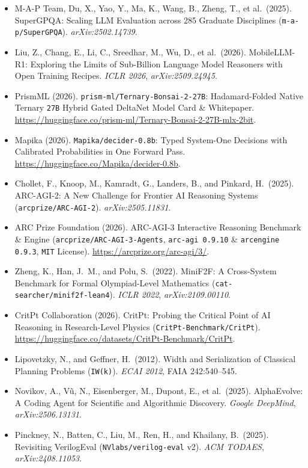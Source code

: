 \documentclass[10pt]{article}
\begin{document}
{\begin{itemize}
  \item M-A-P Team, Du, X., Yao, Y., Ma, K., Wang, B., Zheng, T., et al.\ (2025). SuperGPQA: Scaling LLM Evaluation across 285 Graduate Disciplines (\texttt{m-a-p/SuperGPQA}). \emph{arXiv:2502.14739}.
  \item Liu, Z., Chang, E., Li, C., Sreedhar, M., Wu, D., et al.\ (2026). MobileLLM-R1: Exploring the Limits of Sub-Billion Language Model Reasoners with Open Training Recipes. \emph{ICLR 2026}, \emph{arXiv:2509.24945}.
  \item PrismML (2026). \texttt{prism-ml/Ternary-Bonsai-2-27B}: Hadamard-Folded Native Ternary \texttt{27B} Hybrid Gated DeltaNet Model Card \& Whitepaper. \url{https://huggingface.co/prism-ml/Ternary-Bonsai-2-27B-mlx-2bit}.
  \item Mapika (2026). \texttt{Mapika/decider-0.8b}: Typed System-One Decisions with Calibrated Probabilities in One Forward Pass. \url{https://huggingface.co/Mapika/decider-0.8b}.
  \item Chollet, F., Knoop, M., Kamradt, G., Landers, B., and Pinkard, H.\ (2025). ARC-AGI-2: A New Challenge for Frontier AI Reasoning Systems (\texttt{arcprize/ARC-AGI-2}). \emph{arXiv:2505.11831}.
  \item ARC Prize Foundation (2026). ARC-AGI-3 Interactive Reasoning Benchmark \& Engine (\texttt{arcprize/ARC-AGI-3-Agents}, \texttt{arc-agi 0.9.10} \& \texttt{arcengine 0.9.3}, \texttt{MIT} License). \url{https://arcprize.org/arc-agi/3/}.
  \item Zheng, K., Han, J.\ M., and Polu, S.\ (2022). MiniF2F: A Cross-System Benchmark for Formal Olympiad-Level Mathematics (\texttt{cat-searcher/minif2f-lean4}). \emph{ICLR 2022}, \emph{arXiv:2109.00110}.
  \item CritPt Collaboration (2026). CritPt: Probing the Critical Point of AI Reasoning in Research-Level Physics (\texttt{CritPt-Benchmark/CritPt}). \url{https://huggingface.co/datasets/CritPt-Benchmark/CritPt}.
  \item Lipovetzky, N., and Geffner, H.\ (2012). Width and Serialization of Classical Planning Problems (\texttt{IW(k)}). \emph{ECAI 2012}, FAIA 242:540--545.
  \item Novikov, A., V\~u, N., Eisenberger, M., Dupont, E., et al.\ (2025). AlphaEvolve: A Coding Agent for Scientific and Algorithmic Discovery. \emph{Google DeepMind}, \emph{arXiv:2506.13131}.
  \item Pinckney, N., Batten, C., Liu, M., Ren, H., and Khailany, B.\ (2025). Revisiting VerilogEval (\texttt{NVlabs/verilog-eval} v2). \emph{ACM TODAES}, \emph{arXiv:2408.11053}.

\end{itemize}}
\end{document}
